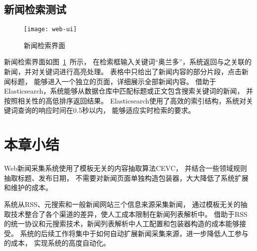 \subsection{新闻检索测试}

\begin{figure}[htbp]
\centering
\texttt{[image: web-ui]}
\caption{新闻检索界面}
\label{fig:web-ui}
\end{figure}

新闻检索界面如图~\ref{fig:web-ui}~所示，
在检索框输入关键词“奥兰多”，系统返回与之关联的新闻，并对关键词进行高亮处理。
表格中只给出了新闻内容的部分片段，点击新闻标题，
能够进入一个独立的页面，详细展示全部新闻内容。
借助于Elasticsearch，系统能够从数据仓库中匹配标题或正文包含搜索关键词的新闻，
并按照相关性的高低排序返回结果。
Elasticsearch使用了高效的索引结构，系统对关键词查询的响应时间在0.5秒以内，
能够适应实时检索的要求。

\section{本章小结}

Web新闻采集系统使用了模板无关的内容抽取算法CEVC，
并结合一些领域规则抽取标题、发布日期，
不需要对新闻页面单独构造包装器，大大降低了系统扩展和维护的成本。

系统从RSS、元搜索和一般新闻网站三个信息来源采集新闻，
通过模板无关的抽取技术整合了各个渠道的差异，使人工成本限制在新闻列表解析中。
借助于RSS的统一协议和元搜索技术，新闻列表解析中人工配置和包装器构造的成本能够接受。
系统的后续工作将集中于如何自动扩展新闻采集来源，进一步降低人工参与的成本，
实现系统的高度自动化。
